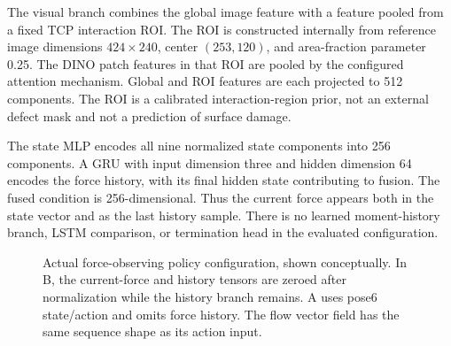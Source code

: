 The visual branch combines the global image feature with a feature pooled from a fixed TCP interaction ROI. The ROI is constructed internally from reference image dimensions \(424\times240\), center \((253,120)\), and area-fraction parameter 0.25. The DINO patch features in that ROI are pooled by the configured attention mechanism. Global and ROI features are each projected to 512 components. The ROI is a calibrated interaction-region prior, not an external defect mask and not a prediction of surface damage.

The state MLP encodes all nine normalized state components into 256 components. A GRU with input dimension three and hidden dimension 64 encodes the force history, with its final hidden state contributing to fusion. The fused condition is 256-dimensional. Thus the current force appears both in the state vector and as the last history sample. There is no learned moment-history branch, LSTM comparison, or termination head in the evaluated configuration.

\begin{figure}[tbp]\centering
{}
\caption[Implemented policy architecture]{Actual force-observing policy configuration, shown conceptually. In B, the current-force and history tensors are zeroed after normalization while the history branch remains. A uses pose6 state/action and omits force history. The flow vector field has the same sequence shape as its action input.}
\label{fig:force_history_policy}
\end{figure}

